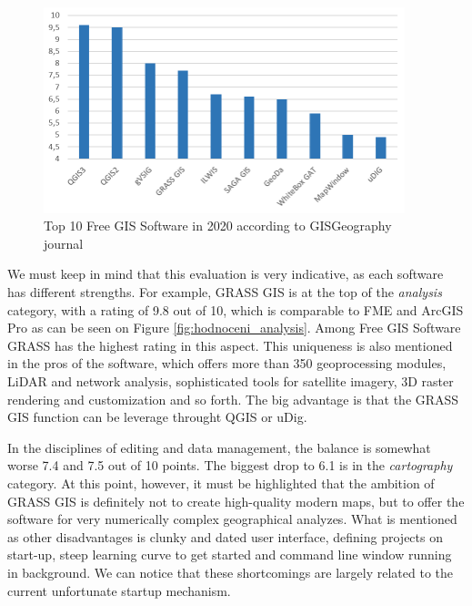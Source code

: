 \documentclass[a4paper,10pt,twoside]{article}
\begin{document}
\begin{figure}[hbt!] 
\begin{center}
\includegraphics[width=10.5cm]{../pictures/hodnoceni_free.png} 
\caption[Top 10 Free GIS Software in 2020 according to GISGeography journal]{Top 10 Free GIS Software in 2020 according to GISGeography journal}
\label{fig:hodnoceni_free}
\end{center}
\end{figure}

We must keep in mind that this evaluation is very indicative, as each software has different strengths. For example, GRASS GIS is at the top of the \textit{analysis} category, with a rating of 9.8 out of 10, which is comparable to FME and ArcGIS Pro as can be seen on Figure \ref{fig:hodnoceni_analysis}. Among Free GIS Software GRASS has the highest rating in this aspect. This uniqueness is also mentioned in the pros of the software, which offers more than 350 geoprocessing modules, LiDAR and network analysis, sophisticated tools for satellite imagery, 3D raster rendering and customization and so forth.  The big advantage is that the GRASS GIS function can be leverage throught QGIS or uDig. 

In the disciplines of editing and data management, the balance is somewhat worse 7.4 and 7.5 out of 10 points. The biggest drop to 6.1 is in the \textit{cartography} category. At this point, however, it must be highlighted that the ambition of GRASS GIS is definitely not to create high-quality modern maps, but to offer the software for very numerically complex geographical analyzes. What is mentioned as other disadvantages is clunky and dated user interface, defining projects on start-up, steep learning curve to get started and command line window running in background. We can notice that these shortcomings are largely related to the current unfortunate startup mechanism.\\
\end{document}
